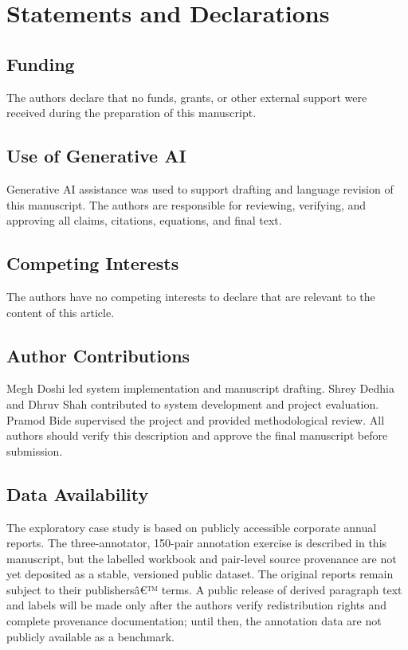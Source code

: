 \documentclass[pdflatex,sn-basic,Numbered]{sn-jnl}
\begin{document}
\backmatter

\section*{Statements and Declarations}

\subsection*{Funding}
The authors declare that no funds, grants, or other external support were received during the preparation of this manuscript.

\subsection*{Use of Generative AI}
Generative AI assistance was used to support drafting and language revision of this manuscript. The authors are responsible for reviewing, verifying, and approving all claims, citations, equations, and final text.

\subsection*{Competing Interests}
The authors have no competing interests to declare that are relevant to the content of this article.

\subsection*{Author Contributions}
Megh Doshi led system implementation and manuscript drafting. Shrey Dedhia and Dhruv Shah contributed to system development and project evaluation. Pramod Bide supervised the project and provided methodological review. All authors should verify this description and approve the final manuscript before submission.

\subsection*{Data Availability}
The exploratory case study is based on publicly accessible corporate annual reports. The three-annotator, 150-pair annotation exercise is described in this manuscript, but the labelled workbook and pair-level source provenance are not yet deposited as a stable, versioned public dataset. The original reports remain subject to their publishersâ€™ terms. A public release of derived paragraph text and labels will be made only after the authors verify redistribution rights and complete provenance documentation; until then, the annotation data are not publicly available as a benchmark.
\end{document}
